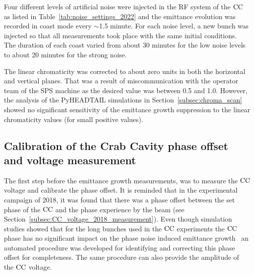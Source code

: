 Four different levels of artificial noise were injected in the RF system of the ${\mathrm{CC}}$ as listed in Table~\ref{tab:noise_settings_2022} and the emittance evolution was recorded in coast mode every $\sim$1.5 minute. For each noise level, a new bunch was injected so that all measurements took place with the same initial conditions. The duration of each coast varied from about 30 minutes for the low noise levels to about 20 minutes for the strong noise. 

The linear chromaticity was corrected to about zero units in both the horizontal and vertical planes. That was a result of miscommunication with the operator team of the SPS machine as the desired value was between 0.5 and 1.0. However, the analysis of the PyHEADTAIL simulations in Section~\ref{subsec:chroma_scan} showed no significant sensitivity of the emittance growth suppression to the linear chromaticity values (for small positive values).

\subsection{Calibration of the Crab Cavity phase offset and voltage measurement}\label{subsec:cc_calibration_2022}

The first step before the emittance growth measurements, was to measure the ${\mathrm{CC}}$ voltage and calibrate the phase offset. It is reminded that in the experimental campaign of 2018, it was found that there was a phase offset between the set phase of the ${\mathrm{CC}}$ and the phase experience by the beam (see Section~\ref{subsec:CC_voltage_2018_measurement}). Even though simulation studies showed that for the long bunches used in the ${\mathrm{CC}}$ experiments the ${\mathrm{CC}}$ phase has no significant impact on the phase noise induced emittance growth~\cite{wp4_triantafyllou_2020} an automated procedure was developed for identifying and correcting this phase offset for completeness. The same procedure can also provide the amplitude of the ${\mathrm{CC}}$ voltage.

